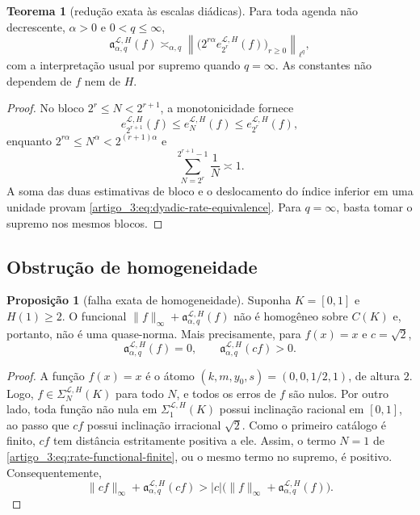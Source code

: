 \documentclass[12pt,a4paper]{article}
\theoremstyle{preciso}
\theoremstyle{definition}
\newcommand{\Library}{\mathcal{L}}
\theoremstyle{preciso}
\newtheorem{theorem}[teorema]{Teorema}
\theoremstyle{preciso}
\theoremstyle{preciso}
\newtheorem{proposition}[teorema]{Proposição}
\theoremstyle{preciso}
\theoremstyle{definition}
\theoremstyle{preciso}
\theoremstyle{definition}
\theoremstyle{preciso}
\theoremstyle{preciso}
\theoremstyle{definition}
\begin{document}
\begin{theorem}[redução exata às escalas diádicas]\label{map:artigo_3:3.2}
\label{artigo_3:thm:dyadic-rate-equivalence}
Para toda agenda não decrescente, $\alpha>0$ e $0<q\le\infty$,
\begin{equation}
 \mathfrak a_{\alpha,q}^{\Library,H}(f)
 \asymp_{\alpha,q}
 \left\|\bigl(2^{r\alpha}
 e_{2^r}^{\Library,H}(f)\bigr)_{r\ge0}\right\|_{\ell^q},
 \label{artigo_3:eq:dyadic-rate-equivalence}
\end{equation}
com a interpretação usual por supremo quando $q=\infty$. As constantes não
dependem de $f$ nem de $H$.
\end{theorem}

\begin{proof}
No bloco $2^r\le N<2^{r+1}$, a monotonicidade fornece
\[
 e_{2^{r+1}}^{\Library,H}(f)
 \le e_N^{\Library,H}(f)
 \le e_{2^r}^{\Library,H}(f),
\]
enquanto $2^{r\alpha}\le N^\alpha<2^{(r+1)\alpha}$ e
\[
 \sum_{N=2^r}^{2^{r+1}-1}\frac1N\asymp1.
\]
A soma das duas estimativas de bloco e o deslocamento do índice inferior em uma
unidade provam \eqref{artigo_3:eq:dyadic-rate-equivalence}. Para $q=\infty$, basta
tomar o supremo nos mesmos blocos.
\end{proof}

\subsection{Obstrução de homogeneidade}

\begin{proposition}[falha exata de homogeneidade]\label{map:artigo_3:3.3}
\label{artigo_3:prop:nonhomogeneous-functional}
Suponha $K=[0,1]$ e $H(1)\ge2$. O funcional
$\|f\|_\infty+\mathfrak a_{\alpha,q}^{\Library,H}(f)$ não é homogêneo sobre
$C(K)$ e, portanto, não é uma quase-norma. Mais precisamente, para
$f(x)=x$ e $c=\sqrt2$,
\begin{equation}
 \mathfrak a_{\alpha,q}^{\Library,H}(f)=0,
 \qquad
 \mathfrak a_{\alpha,q}^{\Library,H}(cf)>0.
 \label{artigo_3:eq:nonhomogeneous-certificate}
\end{equation}
\end{proposition}

\begin{proof}
A função $f(x)=x$ é o átomo $(k,m,y_0,s)=(0,0,1/2,1)$, de altura $2$.
Logo, $f\in\Sigma_N^{\Library,H}(K)$ para todo $N$, e todos os erros de
$f$ são nulos. Por outro lado, toda função não nula em
$\Sigma_1^{\Library,H}(K)$ possui inclinação racional em $[0,1]$, ao passo que
$cf$ possui inclinação irracional $\sqrt2$. Como o primeiro catálogo é
finito, $cf$ tem distância estritamente positiva a ele. Assim, o termo
$N=1$ de \eqref{artigo_3:eq:rate-functional-finite}, ou o mesmo termo no supremo,
é positivo. Consequentemente,
\[
 \|cf\|_\infty+\mathfrak a_{\alpha,q}^{\Library,H}(cf)
 >|c|\bigl(\|f\|_\infty+
 \mathfrak a_{\alpha,q}^{\Library,H}(f)\bigr).
\]
\end{proof}
\end{document}
